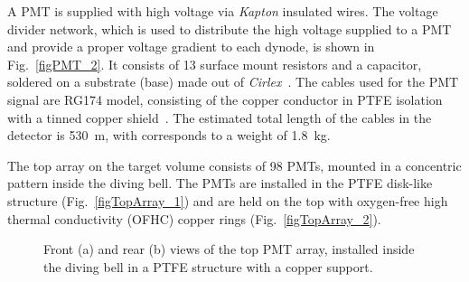 A PMT is supplied with high voltage via {\it Kapton} insulated wires. The voltage divider network, which is used to distribute the high voltage supplied to a PMT and provide a proper voltage gradient to each dynode, is shown in Fig.~\ref{figPMT_2}. It consists of 13 surface mount resistors and a capacitor, soldered on a substrate (base) made out of {\it Cirlex}~\cite{cirlex}. The cables used for the PMT signal are RG174 model, consisting of the copper conductor in PTFE isolation with a tinned copper shield~\cite{RG174cable}. The estimated total length of the cables in the detector is 530~m, with corresponds to a weight of 1.8~kg. 

The top array on the target volume consists of 98 PMTs, mounted in a concentric pattern inside the diving bell. The PMTs are installed in the PTFE disk-like structure (Fig.~\ref{figTopArray_1}) and are held on the top with oxygen-free high thermal conductivity (OFHC) copper rings (Fig.~\ref{figTopArray_2}).


\begin{figure}[!h]
\centering
{}
\caption[Front and rear views of the top PMT array]{Front (a) and rear (b) views of the top PMT array, installed inside the diving bell in a PTFE structure with a copper support.}
\label{figTopArray}
\end{figure}

